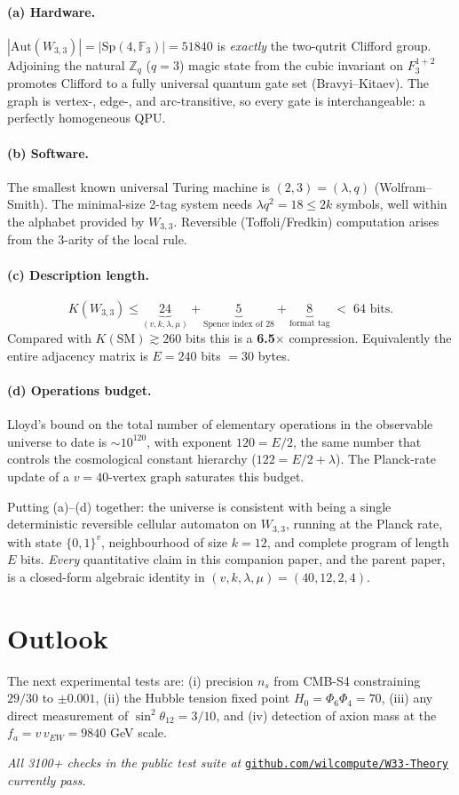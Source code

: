 \documentclass[11pt,a4paper]{article}
\begin{document}
\paragraph{(a) Hardware.}
$|\mathrm{Aut}(W_{3,3})|=|\mathrm{Sp}(4,\mathbb{F}_3)|=51840$ is
\emph{exactly} the two-qutrit Clifford group. Adjoining the natural
$\mathbb{Z}_q$ ($q=3$) magic state from the cubic invariant on
$F_3^{1+2}$ promotes Clifford to a fully universal quantum gate set
(Bravyi--Kitaev). The graph is vertex-, edge-, and arc-transitive, so
every gate is interchangeable: a perfectly homogeneous QPU.

\paragraph{(b) Software.}
The smallest known universal Turing machine is $(2,3)=(\lambda,q)$
(Wolfram--Smith). The minimal-size 2-tag system needs
$\lambda q^2 = 18 \le 2k$ symbols, well within the alphabet provided
by $W_{3,3}$. Reversible (Toffoli/Fredkin) computation arises from the
$3$-arity of the local rule.

\paragraph{(c) Description length.}
\[
K(W_{3,3}) \le \underbrace{24}_{(v,k,\lambda,\mu)} +
\underbrace{5}_{\text{Spence index of }28} +
\underbrace{8}_{\text{format tag}} \;<\; 64 \text{ bits}.
\]
Compared with $K(\mathrm{SM})\gtrsim 260$ bits this is a
\textbf{6.5$\times$} compression. Equivalently the entire adjacency
matrix is $E=240$ bits $=30$ bytes.

\paragraph{(d) Operations budget.}
Lloyd's bound on the total number of elementary operations in the
observable universe to date is $\sim 10^{120}$, with exponent
$120 = E/2$, the same number that controls the cosmological constant
hierarchy ($122 = E/2+\lambda$). The Planck-rate update of a
$v=40$-vertex graph saturates this budget.

Putting (a)--(d) together: the universe is consistent with being a
single deterministic reversible cellular automaton on $W_{3,3}$,
running at the Planck rate, with state $\{0,1\}^v$, neighbourhood of
size $k=12$, and complete program of length $E$ bits. \emph{Every}
quantitative claim in this companion paper, and the parent paper, is a
closed-form algebraic identity in $(v,k,\lambda,\mu)=(40,12,2,4)$.

\section{Outlook}
The next experimental tests are: (i) precision $n_s$ from CMB-S4
constraining $29/30$ to $\pm 0.001$, (ii) the Hubble tension fixed
point $H_0=\Phi_6\Phi_4=70$, (iii) any direct measurement of
$\sin^2\theta_{12}=3/10$, and (iv) detection of axion mass at the
$f_a=v\,v_{EW}=9840$ GeV scale.

\medskip
\noindent\textit{All 3100+ checks in the public test suite at}
\href{https://github.com/wilcompute/W33-Theory}{\texttt{github.com/wilcompute/W33-Theory}} \textit{currently pass.}
\end{document}
